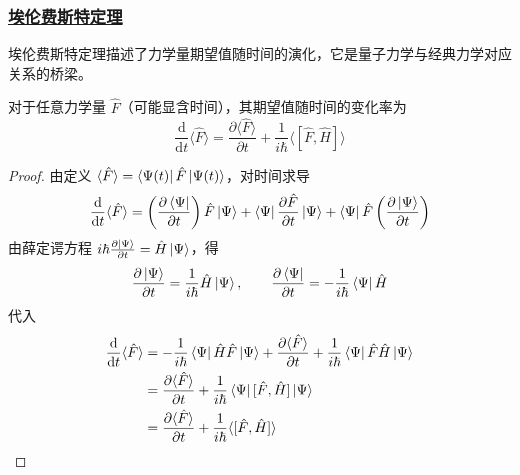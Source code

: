 \subsubsection{\protect\hyperlink{:}{埃伦费斯特定理}}

埃伦费斯特定理描述了力学量期望值随时间的演化，它是量子力学与经典力学对应关系的桥梁。

\begin{theorem}[埃伦费斯特定理]
    对于任意力学量 $\hat{F}$（可能显含时间），其期望值随时间的变化率为
    \begin{equation}
        \frac{\mathrm{d}}{\mathrm{d}t}\langle \hat{F} \rangle = \frac{\partial\langle \hat{F} \rangle}{\partial t} + \frac{1}{i\hbar}\langle [\hat{F}, \hat{H}] \rangle
    \end{equation}
\end{theorem}

\begin{proof}
    由定义 $\langle \hat{F} \rangle = \bra{\Psi(t)}\hat{F}\ket{\Psi(t)}$，对时间求导
    \begin{equation}
        \frac{\mathrm{d}}{\mathrm{d}t}\langle \hat{F} \rangle = \left(\frac{\partial\bra{\Psi}}{\partial t}\right)\hat{F}\ket{\Psi} + \bra{\Psi}\frac{\partial\hat{F}}{\partial t}\ket{\Psi} + \bra{\Psi}\hat{F}\left(\frac{\partial\ket{\Psi}}{\partial t}\right)
    \end{equation}
    由薛定谔方程 $i\hbar\frac{\partial\ket{\Psi}}{\partial t} = \hat{H}\ket{\Psi}$，得
    \begin{equation}
        \frac{\partial\ket{\Psi}}{\partial t} = \frac{1}{i\hbar}\hat{H}\ket{\Psi}, \qquad \frac{\partial\bra{\Psi}}{\partial t} = -\frac{1}{i\hbar}\bra{\Psi}\hat{H}
    \end{equation}
    代入
    \begin{align}
        \frac{\mathrm{d}}{\mathrm{d}t}\langle \hat{F} \rangle &= -\frac{1}{i\hbar}\bra{\Psi}\hat{H}\hat{F}\ket{\Psi} + \frac{\partial\langle \hat{F} \rangle}{\partial t} + \frac{1}{i\hbar}\bra{\Psi}\hat{F}\hat{H}\ket{\Psi} \nonumber \\
        &= \frac{\partial\langle \hat{F} \rangle}{\partial t} + \frac{1}{i\hbar}\bra{\Psi}[\hat{F}, \hat{H}]\ket{\Psi} \nonumber \\
        &= \frac{\partial\langle \hat{F} \rangle}{\partial t} + \frac{1}{i\hbar}\langle [\hat{F}, \hat{H}] \rangle
    \end{align}
\end{proof}

